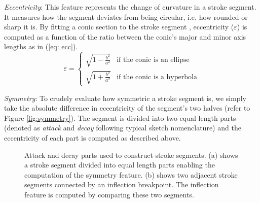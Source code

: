 \noindent \emph{Eccentricity}: This feature represents the change of curvature in a stroke segment. It measures how the segment deviates from being circular, i.e. how rounded or sharp it is. By fitting a conic section to the stroke segment \cite{taubin1991estimation}, eccentricity ($\varepsilon$) is computed as a function of the ratio between the conic's major and minor axis lengths as in (\ref{eq: ecc}).
\vspace{-1mm}
\begin{equation}
\varepsilon=\begin{cases}
\sqrt{1-\frac{b^{2}}{a^{2}}} & \text{if the conic is an ellipse}\\
\sqrt{1+\frac{b^{2}}{a^{2}}} & \text{if the conic is a hyperbola}
\end{cases} \label{eq: ecc}
\end{equation}
\vspace{-3mm}

\noindent \emph{Symmetry}: To crudely evaluate how symmetric a stroke segment is, we simply take the absolute difference in eccentricity of the segment's two halves (refer to Figure \ref{fig:symmetry}). The segment is divided into two equal length parts (denoted as \emph{attack} and \emph{decay} following typical sketch nomenclature) and the eccentricity of each part is computed as described above.
\vspace{-2mm}

\begin{figure}[ht]
\centering
{}
\vspace{-3mm}
\caption{Attack and decay parts used to construct stroke segments. (a) shows a stroke segment divided into equal length parts enabling the computation of the symmetry feature. (b) shows two adjacent stroke segments connected by an inflection breakpoint. The inflection feature is computed by comparing these two segments.}\vspace{-6mm}
\end{figure}

